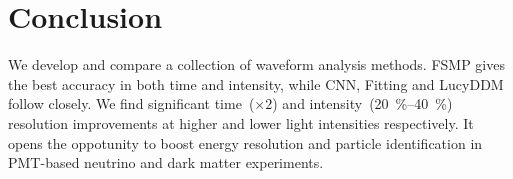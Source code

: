 \section{Conclusion}
\label{sec:conclusion}

We develop and compare a collection of waveform analysis methods.  FSMP gives the best accuracy in both time and intensity, while CNN, Fitting and LucyDDM follow closely.  We find significant time~($\times 2$) and intensity~(\SIrange{20}{40}{\percent}) resolution improvements at higher and lower light intensities respectively.  It opens the oppotunity to boost energy resolution and particle identification in PMT-based neutrino and dark matter experiments.
